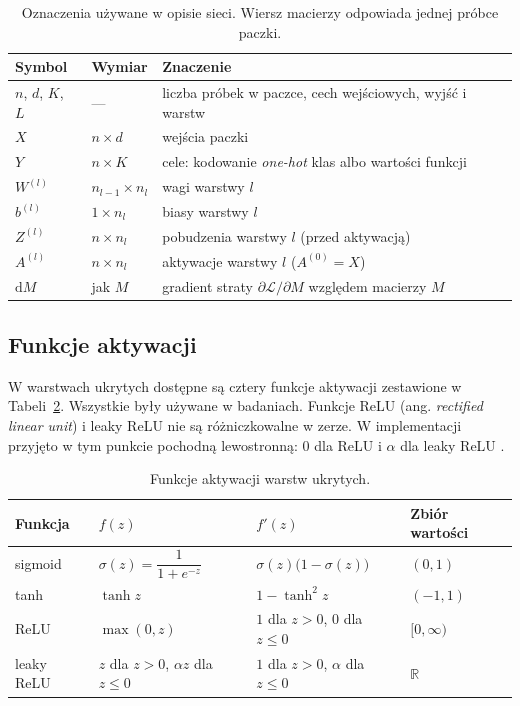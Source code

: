 \begin{table}[H]
    \centering
    \caption{Oznaczenia używane w opisie sieci. Wiersz macierzy odpowiada jednej próbce paczki.}
    \label{tab:mlp-notation}
    \begin{tabular}{lll}
        \toprule
        Symbol & Wymiar & Znaczenie \\
        \midrule
        $n$, $d$, $K$, $L$ & --- & liczba próbek w paczce, cech wejściowych, wyjść i warstw \\
        $X$ & $n \times d$ & wejścia paczki \\
        $Y$ & $n \times K$ & cele: kodowanie \textit{one-hot} klas albo wartości funkcji \\
        $W^{(l)}$ & $n_{l-1} \times n_l$ & wagi warstwy $l$ \\
        $b^{(l)}$ & $1 \times n_l$ & biasy warstwy $l$ \\
        $Z^{(l)}$ & $n \times n_l$ & pobudzenia warstwy $l$ (przed aktywacją) \\
        $A^{(l)}$ & $n \times n_l$ & aktywacje warstwy $l$ ($A^{(0)} = X$) \\
        $\mathrm{d}M$ & jak $M$ & gradient straty $\partial \mathcal{L} / \partial M$ względem macierzy $M$ \\
        \bottomrule
    \end{tabular}
\end{table}

\subsection{Funkcje aktywacji}
\label{sec:mlp-activations}

W warstwach ukrytych dostępne są cztery funkcje aktywacji zestawione w Tabeli~\ref{tab:activations}. Wszystkie były używane w badaniach. Funkcje ReLU (ang. \textit{rectified linear unit}) i leaky ReLU nie są różniczkowalne w zerze. W implementacji przyjęto w tym punkcie pochodną lewostronną: $0$ dla ReLU i $\alpha$ dla leaky ReLU \cite{goodfellow2016}.

\begin{table}[H]
    \centering
    \caption{Funkcje aktywacji warstw ukrytych.}
    \label{tab:activations}
    \begin{tabular}{llll}
        \toprule
        Funkcja & $f(z)$ & $f'(z)$ & Zbiór wartości \\
        \midrule
        sigmoid & $\sigma(z) = \dfrac{1}{1 + e^{-z}}$ & $\sigma(z) \big(1 - \sigma(z)\big)$ & $(0, 1)$ \\[2ex]
        tanh & $\tanh z$ & $1 - \tanh^2 z$ & $(-1, 1)$ \\[1ex]
        ReLU & $\max(0, z)$ & $1$ dla $z > 0$, $0$ dla $z \le 0$ & $[0, \infty)$ \\[1ex]
        leaky ReLU & $z$ dla $z > 0$, $\alpha z$ dla $z \le 0$ & $1$ dla $z > 0$, $\alpha$ dla $z \le 0$ & $\mathbb{R}$ \\
        \bottomrule
    \end{tabular}
\end{table}

